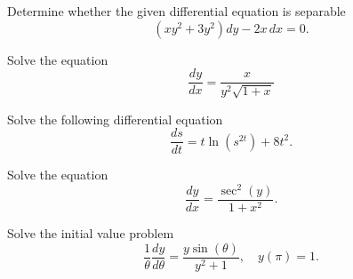 \documentclass[11pt]{article}
\begin{document}
\makelabtitle

\begin{problem}
Determine whether the given differential equation is separable
\begin{equation*}
     (xy^2 + 3y^2) dy - 2x \, dx =0.
\end{equation*}
\end{problem}


\begin{problem}
Solve the equation
\begin{equation*}
     \dfrac{ dy }{dx} = \frac{x}{y^2 \sqrt{1+x}}
\end{equation*}
\end{problem}



\begin{problem}
Solve the following differential equation
\begin{equation*}
     \dfrac{ ds }{dt}  =  t \ln(s^{2t}) + 8 t^2.
\end{equation*}
\end{problem}



\begin{problem}
Solve the equation
\begin{equation*}
     \dfrac{ dy }{dx} = \frac{\sec^2(y)}{1+x^2}.
\end{equation*}
\end{problem}

\begin{problem}
Solve the initial value problem
\begin{equation*}
     \dfrac{1}{\theta} \dfrac{ dy }{d\theta} = \frac{y \sin(\theta)}{y^2+1}, \quad y(\pi)=1.
\end{equation*}
\end{problem}
\end{document}
